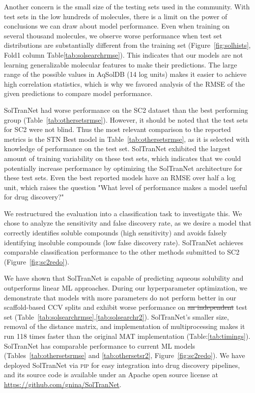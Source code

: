 \documentclass[journal=jcim,manuscript=applicationnotes]{achemso} %
\providecommand{\DIFaddtex}[1]{{\protect\color{blue}\uwave{#1}}} %
\providecommand{\DIFdeltex}[1]{{\protect\color{red}\sout{#1}}}                      %
\providecommand{\DIFaddbegin}{} %
\providecommand{\DIFaddend}{} %
\providecommand{\DIFdelbegin}{} %
\providecommand{\DIFdelend}{} %
\providecommand{\DIFadd}[1]{\texorpdfstring{\DIFaddtex{#1}}{#1}} %
\providecommand{\DIFdel}[1]{\texorpdfstring{\DIFdeltex{#1}}{}} %
\begin{document}
Another concern is the small size of the testing sets used in the community.
With test sets in the low hundreds of molecules, there is a limit on the power of conclusions we can draw about model performance.
Even when training on several thousand molecules, we observe worse performance when test set distributions are substantially different from the training set (Figure~\ref{fig:solhists}, Fold1 column Table\ref{tab:solsearchrmse}).
This indicates that our models are not learning generalizable molecular features to make their predictions.
The large range of the possible values in AqSolDB (14 log units) makes it easier to achieve high correlation statistics, which is why we favored analysis of the RMSE of the given predictions to compare model performance.

SolTranNet had worse performance on the SC2 dataset than the best performing group (Table~\ref{tab:othersetsrmse}).
However, it should be noted that the test sets for SC2 were not blind.
Thus the most relevant comparison to the reported metrics is the STN Best model in Table~\ref{tab:othersetsrmse}, as it is selected with knowledge of performance on the test set.
SolTranNet exhibited the largest amount of training variability on these test sets, which indicates that we could potentially increase performance by optimizing the SolTranNet architecture for these test sets.
Even the best reported models have an RMSE over half a log unit, which raises the question "What level of performance makes a model useful for drug discovery?"

We restructured the evaluation into a classification task to investigate this. 
We chose to analyze the sensitivity and false discovery rate, as we desire a model that correctly identifies soluble compounds (high sensitivity) and avoids falsely identifying insoluble compounds (low false discovery rate).
SolTranNet achieves comparable classification performance to the other methods submitted to SC2 (Figure~\ref{fig:sc2redo}).

We have shown that SolTranNet is capable of predicting aqueous solubility and outperforms linear ML approaches.
During our hyperparameter optimization, we demonstrate that models with more parameters do not perform better in our scaffold-based CCV splits and exhibit worse performance on \DIFdelbegin \DIFdel{an independent }\DIFdelend \DIFaddbegin \DIFadd{a withheld }\DIFaddend test set (Table~\ref{tab:solsearchrmse},\ref{tab:solsearchr2}).
SolTranNet's smaller size, removal of the distance matrix, and implementation of multiprocessing makes it run 118 times faster than the original MAT implementation (Table:\ref{tab:timings}).
SolTranNet has comparable performance to current ML models (Tables~\ref{tab:othersetsrmse} and \ref{tab:othersetsr2}, Figure~\ref{fig:sc2redo}).
We have deployed SolTranNet via \textsc{pip} for easy integration into drug discovery pipelines, and its source code is available under an Apache open source license at \url{https://github.com/gnina/SolTranNet}.
\end{document}

